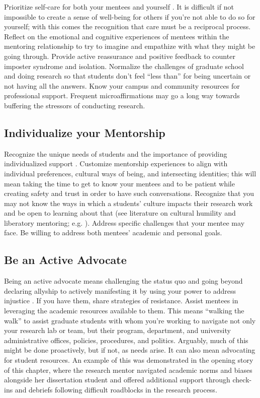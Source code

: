 \documentclass[
  11pt,
]{book}
\begin{document}
Prioritize self-care for both your mentees and yourself \citep{cho_under_2021, kent_recommendations_2022, mangione_mentoring_2018, perez-lopez_ten_2022}. It is difficult if not impossible to create a sense of well-being for others if you're not able to do so for yourself; with this comes the recognition that care must be a reciprocal process. Reflect on the emotional and cognitive experiences of mentees within the mentoring relationship to try to imagine and empathize with what they might be going through. Provide active reassurance and positive feedback to counter imposter syndrome and isolation. Normalize the challenges of graduate school and doing research so that students don't feel ``less than'' for being uncertain or not having all the answers. Know your campus and community resources for professional support. Frequent microaffirmations \citep{koch_qualitative_2022} may go a long way towards buffering the stressors of conducting research.

\subsection{Individualize your Mentorship}\label{individualize-your-mentorship}

Recognize the unique needs of students and the importance of providing individualized support \citep{cirillo-mccarthy_developing_2022}. Customize mentorship experiences to align with individual preferences, cultural ways of being, and intersecting identities; this will mean taking the time to get to know your mentees and to be patient while creating safety and trust in order to have such conversations. Recognize that you may not know the ways in which a students' culture impacts their research work and be open to learning about that (see literature on cultural humility and liberatory mentoring; e.g. \citet{malone_liberatory_2022}). Address specific challenges that your mentee may face. Be willing to address both mentees' academic and personal goals.

\subsection{Be an Active Advocate}\label{be-an-active-advocate}

Being an active advocate means challenging the status quo and going beyond declaring allyship to actively manifesting it by using your power to address injustice \citep{kim_putting_2021}. If you have them, share strategies of resistance. Assist mentees in leveraging the academic resources available to them. This means ``walking the walk'' to assist graduate students with whom you're working to navigate not only your research lab or team, but their program, department, and university administrative offices, policies, procedures, and politics. Arguably, much of this might be done proactively, but if not, as needs arise. It can also mean advocating for student resources. An example of this was demonstrated in the opening story of this chapter, where the research mentor navigated academic norms and biases alongside her dissertation student and offered additional support through check-ins and debriefs following difficult roadblocks in the research process.
\end{document}
